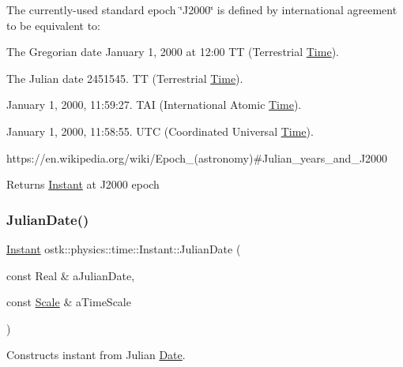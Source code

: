 The currently-\/used standard epoch \char`\"{}\+J2000\char`\"{} is defined by international agreement to be equivalent to\+:
\begin{DoxyItemize}
\item The Gregorian date January 1, 2000 at 12\+:00 TT (Terrestrial \hyperlink{classostk_1_1physics_1_1time_1_1_time}{Time}).
\item The Julian date 2451545. TT (Terrestrial \hyperlink{classostk_1_1physics_1_1time_1_1_time}{Time}).
\item January 1, 2000, 11\+:59\+:27. T\+AI (International Atomic \hyperlink{classostk_1_1physics_1_1time_1_1_time}{Time}).
\item January 1, 2000, 11\+:58\+:55. U\+TC (Coordinated Universal \hyperlink{classostk_1_1physics_1_1time_1_1_time}{Time}).
\end{DoxyItemize}

https\+://en.wikipedia.\+org/wiki/\+Epoch\+\_\+(astronomy)\#\+Julian\+\_\+years\+\_\+and\+\_\+\+J2000

\begin{DoxyReturn}{Returns}
\hyperlink{classostk_1_1physics_1_1time_1_1_instant}{Instant} at J2000 epoch 
\end{DoxyReturn}
\mbox{\label{classostk_1_1physics_1_1time_1_1_instant_a8826d68093086f8b203a5be940ef34fb}} 
\subsubsection{\texorpdfstring{Julian\+Date()}{JulianDate()}}
{\footnotesize\ttfamily \hyperlink{classostk_1_1physics_1_1time_1_1_instant}{Instant} ostk\+::physics\+::time\+::\+Instant\+::\+Julian\+Date (\begin{DoxyParamCaption}\item[{const Real \&}]{a\+Julian\+Date,  }\item[{const \hyperlink{namespaceostk_1_1physics_1_1time_adf23d37bd8641fb76a0e98ab46a70df7}{Scale} \&}]{a\+Time\+Scale }\end{DoxyParamCaption})\hspace{0.3cm}{\ttfamily [static]}}



Constructs instant from Julian \hyperlink{classostk_1_1physics_1_1time_1_1_date}{Date}. 


